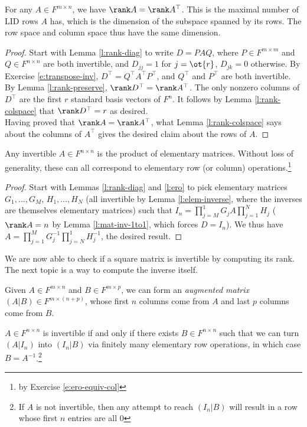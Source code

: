 \begin{corollary}\label{c:rank-transpose}
For any $A \in F^{m \times n}$, we have $\rank A=\rank A^\top$. This is the maximal number of LID rows $A$ has, which is the dimension of the subspace spanned by its rows. The row space and column space thus have the same dimension.
\end{corollary}
\begin{proof}
Start with Lemma \ref{l:rank-diag} to write $D=PAQ$, where $P \in F^{m \times m}$ and $Q \in F^{n \times n}$ are both invertible, and $D_{jj}=1$ for $j=\ot{r}$, $D_{jk}=0$ otherwise. By Exercise \ref{e:transpose-inv}, $D^\top =Q^\top A^\top P^\top$, and $Q^\top$ and $P^\top$ are both invertible. By Lemma \ref{l:rank-preserve}, $\rank D^\top =\rank A^\top$. The only nonzero columns of $D^\top$ are the first $r$ standard basis vectors of $F^n$. It follows by Lemma \ref{l:rank-colspace} that $\rank D^\top =r$ as desired.\\
Having proved that $\rank A=\rank A^\top$, what Lemma \ref{l:rank-colspace} says about the columns of $A^\top$ gives the desired claim about the rows of $A$.
\end{proof}
\begin{corollary}\label{c:inv-prod-elem}
Any invertible $A \in F^{n \times n}$ is the product of elementary matrices. Without loss of generality, these can all correspond to elementary row (or column) operations.\footnote{by Exercise \ref{e:ero-equiv-col}}
\end{corollary}
\begin{proof}
Start with Lemmas \ref{l:rank-diag} and \ref{l:ero} to pick elementary matrices $G_1, \ldots,G_M$, $H_1, \ldots,H_N$ (all invertible by Lemma \ref{l:elem-inverse}, where the inverses are themselves elementary matrices) such that $I_n= \prod_{j=M}^1G_jA \prod_{j=1}^NH_j$ ($\rank A=n$ by Lemma \ref{l:mat-inv-1to1}, which forces $D=I_n$). We thus have $A= \prod_{j=1}^MG_j^{-1}\prod_{j=N}^1H_j^{-1}$, the desired result.
\end{proof}
We are now able to check if a square matrix is invertible by computing its rank. The next topic is a way to compute the inverse itself.
\begin{defn}
Given $A \in F^{m \times n}$ and $B \in F^{m \times p}$, we can form an \emph{augmented matrix} $(A|B) \in F^{m \times (n+p)}$, whose first $n$ columns come from $A$ and last $p$ columns come from $B$.
\end{defn}
\begin{lem}
$A \in F^{n \times n}$ is invertible if and only if there exists $B \in F^{n \times n}$ such that we can turn $(A|I_n)$ into $(I_n|B)$ via finitely many elementary row operations, in which case $B=A^{-1}$.\footnote{If $A$ is not invertible, then any attempt to reach $(I_n|B)$ will result in a row whose first $n$ entries are all 0}
\end{lem}
